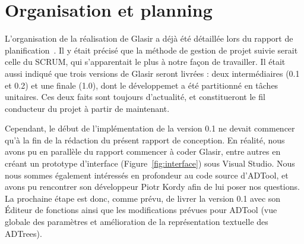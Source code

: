 \section{Organisation et planning}
    \label{sec:orga}

    L'organisation de la réalisation de Glasir a déjà été détaillée lors du rapport de planification~\cite{planif}. Il y était précisé que la méthode de gestion de projet suivie serait celle du SCRUM, qui s'apparentait le plus à notre façon de travailler. Il était aussi indiqué que trois versions de Glasir seront livrées : deux intermédiaires (0.1 et 0.2) et une finale (1.0), dont le développemet a été partitionné en tâches unitaires. Ces deux faits sont toujours d'actualité, et constitueront le fil conducteur du projet à partir de maintenant. 

    Cependant, le début de l'implémentation de la version 0.1 ne devait commencer qu'à la fin de la rédaction du présent rapport de conception. En réalité, nous avons pu en parallèle du rapport commencer à coder Glasir, entre autres en créant un prototype d'interface ({\sc Figure}~\ref{fig:interface}) sous Visual Studio. Nous nous sommes également intéressés en profondeur au code source d'ADTool, et avons pu rencontrer son développeur Piotr {\sc Kordy} afin de lui poser nos questions. La prochaine étape est donc, comme prévu, de livrer la version 0.1 avec son Éditeur de fonctions ainsi que les modifications prévues pour ADTool (vue globale des paramètres et amélioration de la représentation textuelle des ADTrees).